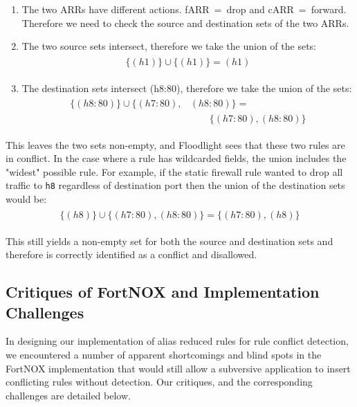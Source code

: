 \begin{enumerate}
\item The two ARRs have different actions. \mbox{fARR = drop} and \mbox{cARR = forward}. Therefore we need to check the source and destination sets of the two ARRs.
\item The two source sets intersect, therefore we take the union of the sets:
\begin{align}
\begin{aligned}
\{(h1)\} \cup \{(h1)\} = (h1) \nonumber
\end{aligned}
\end{align}
\item The destination sets intersect (h8:80), therefore we take the union of the sets:
\begin{align}
\begin{aligned}
\{(h8:80)\} \cup \{(h7:80),&(h8:80)\} = \\
        & \qquad \{(h7:80),(h8:80)\} \nonumber
\end{aligned}
\end{align}
\end{enumerate} 

This leaves the two sets non-empty, and Floodlight sees that these two rules are in conflict.
In the case where a rule has wildcarded fields, the union includes the "widest" possible rule.
For example, if the static firewall rule wanted to drop all traffic to \texttt{h8} regardless of destination port then the union of the destination sets would be:
\begin{align}
\begin{aligned}
\{(h8)\} \cup \{(h7:80),(h8:80)\} =  \{(h7:80),(h8)\} \nonumber
\end{aligned}
\end{align}

This still yields a non-empty set for both the source and destination sets and therefore is correctly identified as a conflict and disallowed.

\subsection{Critiques of FortNOX and Implementation Challenges}
\label{subsec:critique}
In designing our implementation of alias reduced rules for rule conflict detection, we encountered a number of apparent shortcomings and blind spots in the FortNOX implementation that would still allow a subversive application to insert conflicting rules without detection. Our critiques, and the corresponding challenges are detailed below.

